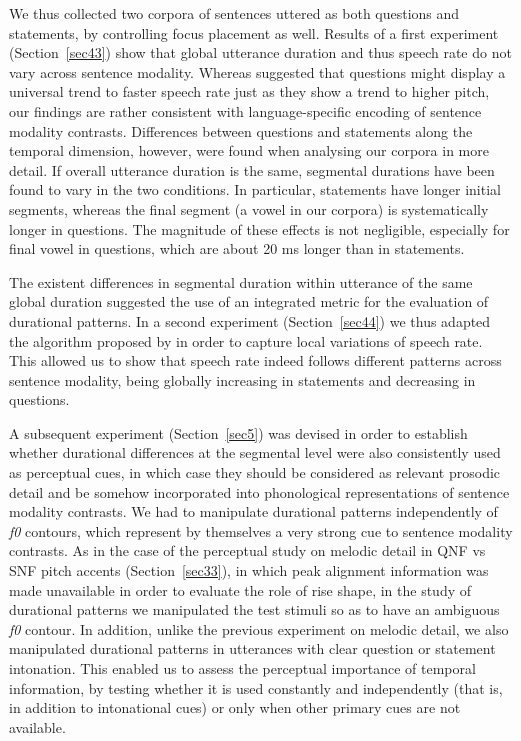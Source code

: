 We thus collected two corpora of sentences uttered as both questions and statements, by controlling focus placement as well. Results of a first experiment (Section~\ref{sec43}) show that global utterance duration and thus speech rate do not vary across sentence modality. Whereas \citet{vanheuven2005speech} suggested that questions might display a universal trend to faster speech rate just as they show a trend to higher pitch, our findings are rather consistent with language-specific encoding of sentence modality contrasts. Differences between questions and statements along the temporal dimension, however, were found when analysing our corpora in more detail. If overall utterance duration is the same, segmental durations have been found to vary in the two conditions. In particular, statements have longer initial segments, whereas the final segment (a vowel in our corpora) is systematically longer in questions. The magnitude of these effects is not negligible, especially for final vowel in questions, which are about 20 ms longer than in statements. 

The existent differences in segmental duration within utterance of the same global duration suggested the use of an integrated metric for the evaluation of durational patterns. In a second experiment (Section~\ref{sec44}) we thus adapted the algorithm proposed by \citet{pfitzinger2001phonetische} in order to capture local variations of speech rate. This allowed us to show that speech rate indeed follows different patterns across sentence modality, being globally increasing in statements and decreasing in questions.

A subsequent experiment (Section~\ref{sec5}) was devised in order to establish whether durational differences at the segmental level were also consistently used as perceptual cues, in which case they should be considered as relevant prosodic detail and be somehow incorporated into phonological representations of sentence modality contrasts. We had to manipulate durational patterns independently of \textit{f0} contours, which represent by themselves a very strong cue to sentence modality contrasts. As in the case of the perceptual study on melodic detail in QNF vs SNF pitch accents (Section~\ref{sec33}), in which peak alignment information was made unavailable in order to evaluate the role of rise shape, in the study of durational patterns we manipulated the test stimuli so as to have an ambiguous \textit{f0} contour. In addition, unlike the previous experiment on melodic detail, we also manipulated durational patterns in utterances with clear question or statement intonation. This enabled us to assess the perceptual importance of temporal information, by testing whether it is used constantly and independently (that is, in addition to intonational cues) or only when other primary cues are not available. 

